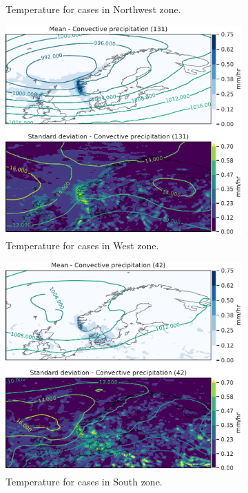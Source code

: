 \begin{figure}
\begin{subfigure}[b]{0.49\textwidth}
    \caption{Temperature for cases in Northwest zone.}
    \label{fig:NordWestcP}
\end{subfigure}
\begin{subfigure}[b]{0.49\textwidth}
    \centering
    \includegraphics[width=\textwidth]{Figures/cPVest.pdf}
    \caption{Temperature for cases in West zone.}
    \label{fig:WestcP}
\end{subfigure}
\begin{subfigure}[b]{0.49\textwidth}
    \centering
    \includegraphics[width=\textwidth]{Figures/cPSor.pdf}
    \caption{Temperature for cases in South zone.}
    \label{fig:SouthcP}
\end{subfigure}
\caption{ }
\label{fig:convectivezones}
\end{figure}

